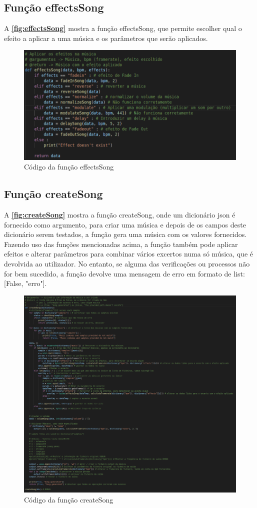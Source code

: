 \documentclass{report}
\begin{document}
\subsection{Função effectsSong}
\label{ssec:effectsSong}
A \textbf{\autoref{fig:effectsSong}} mostra a função effectsSong, que permite escolher qual o efeito a aplicar a uma música e
os parâmetros que serão aplicados.

\begin{figure}[!h]
\center 
\includegraphics[width=330pt]{img/effectsSong.png}
\caption{Código da função effectsSong}
\label{fig:effectsSong}
\end{figure}

\subsection{Função createSong}
\label{ssec:createSong}
A \textbf{\autoref{fig:createSong}} mostra a função createSong, onde um dicionário \ac{json} é fornecido como argumento, para criar
uma música e depois de os campos deste dicionário serem testados, a função gera uma música com os valores fornecidos. Fazendo 
uso das funções mencionadas acima, a função também pode aplicar efeitos e alterar parâmetros para combinar vários excertos
numa só música, que é devolvida ao utilizador. No entanto, se alguma das verificações ou processos não for bem sucedido, a
função devolve uma mensagem de erro em formato de list: [False, "erro"].

\begin{figure}[!h]
\center 
\includegraphics[width=330pt]{img/createSong.png}
\caption{Código da função createSong}
\label{fig:createSong}
\end{figure}
\end{document}
